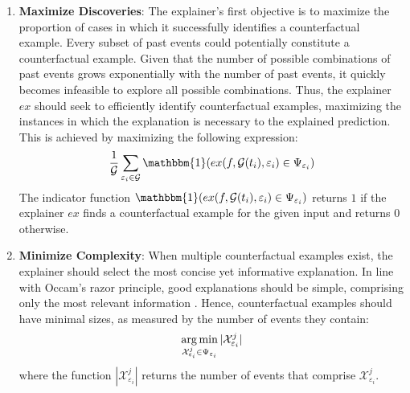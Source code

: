 \begin{enumerate}
    \item \textbf{Maximize Discoveries}: The explainer's first objective is to maximize the proportion of cases in which it successfully identifies a counterfactual example. Every subset of past events could potentially constitute a counterfactual example. Given that the number of possible combinations of past events grows exponentially with the number of past events, it quickly becomes infeasible to explore all possible combinations. Thus, the explainer $ex$ should seek to efficiently identify counterfactual examples, maximizing the instances in which the explanation is necessary to the explained prediction. This is achieved by maximizing the following expression:
    \begin{equation}
        \label{e_maxExplanationRate}
        \frac{1}{\mathcal{G}} \sum_{\varepsilon_{i} \in \mathcal{G}} \mathbbm{1}(ex(f, \mathcal{G}(t_i), \varepsilon_{i}) \in \Psi_{\varepsilon_i})
    \end{equation}
    The indicator function $\mathbbm{1}(ex(f, \mathcal{G}(t_i), \varepsilon_{i}) \in \Psi_{\varepsilon_i})$ returns $1$ if the explainer $ex$ finds a counterfactual example for the given input and returns $0$ otherwise.
    \item \textbf{Minimize Complexity}: When multiple counterfactual examples exist, the explainer should select the most concise yet informative explanation. In line with Occam's razor principle, good explanations should be simple, comprising only the most relevant information \cite{yuan_explainability_2020, tan_learning_2022}. Hence, counterfactual examples should have minimal sizes, as measured by the number of events they contain:
    \begin{equation}
        \label{e_minCFExampleSize}
        \operatorname*{arg\,min}_{\mathcal{X}_{\varepsilon_i}^j \in \Psi_{\varepsilon_i}} |\mathcal{X}_{\varepsilon_i}^j|
    \end{equation}
    where the function $|\mathcal{X}_{\varepsilon_i}^j|$ returns the number of events that comprise $\mathcal{X}_{\varepsilon_i}^j$.
\end{enumerate}




